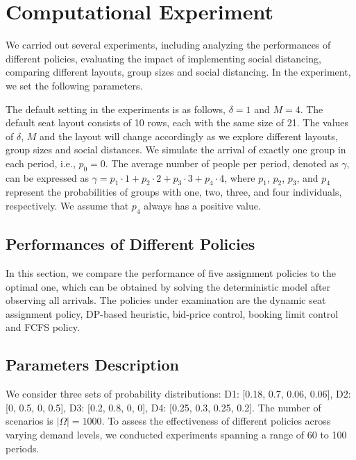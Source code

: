 \section{Computational Experiment}
We carried out several experiments, including analyzing the performances of different policies, evaluating the impact of implementing social distancing, comparing different layouts, group sizes and social distancing. In the experiment, we set the following parameters. 

The default setting in the experiments is as follows, $\delta =1$ and $M =4$. The default seat layout consists of 10 rows, each with the same size of 21. The values of $\delta$, $M$ and the layout will change accordingly as we explore different layouts, group sizes and social distances.
We simulate the arrival of exactly one group in each period, i.e., $p_0 = 0$. The average number of people per period, denoted as $\gamma$, can be expressed as $\gamma = p_1 \cdot 1 + p_2 \cdot 2 + p_3 \cdot 3 + p_4 \cdot 4$, where $p_1$, $p_2$, $p_3$, and $p_4$ represent the probabilities of groups with one, two, three, and four individuals, respectively. We assume that $p_4$ always has a positive value.

\subsection{Performances of Different Policies}
In this section, we compare the performance of five assignment policies to the optimal one, which can be obtained by solving the deterministic model after observing all arrivals. The policies under examination are the dynamic seat assignment policy, DP-based heuristic, bid-price control, booking limit control and FCFS policy.



\subsection*{Parameters Description}
We consider three sets of probability distributions: D1: [0.18, 0.7, 0.06, 0.06], D2: [0, 0.5, 0, 0.5], D3: [0.2, 0.8, 0, 0], D4: [0.25, 0.3, 0.25, 0.2]. The number of scenarios is $|\Omega| = 1000$. To assess the effectiveness of different policies across varying demand levels, we conducted experiments spanning a range of 60 to 100 periods. 

